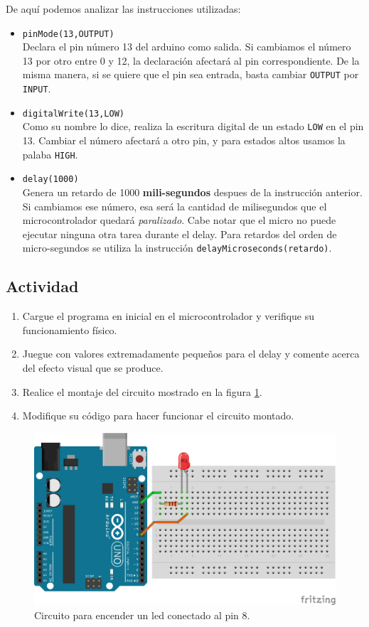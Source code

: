 \documentclass[letterpaper, 10pt]{report}
\begin{document}
De aquí podemos analizar las instrucciones utilizadas:
\begin{itemize}
\item \texttt{pinMode(13,OUTPUT)}\\
Declara el pin número 13 del arduino como salida. Si cambiamos el número 13 por otro entre 0 y 12, la declaración afectará al pin correspondiente. De la misma manera, si se quiere que el pin sea entrada, basta cambiar \texttt{OUTPUT} por \texttt{INPUT}.

\item \texttt{digitalWrite(13,LOW)}\\
Como su nombre lo dice, realiza la escritura digital de un estado \texttt{LOW} en el pin 13. Cambiar el número afectará a otro pin, y para estados altos usamos la palaba \texttt{HIGH}.

\item \texttt{delay(1000)}\\
Genera un retardo de 1000 \textbf{mili-segundos} despues de la instrucción anterior. Si cambiamos ese número, esa será la cantidad de milisegundos que el microcontrolador quedará \emph{paralizado}. Cabe notar que el micro no puede ejecutar ninguna otra tarea durante el delay. Para retardos del orden de micro-segundos se utiliza la instrucción \texttt{delayMicroseconds(retardo)}.
\end{itemize}

\subsection{Actividad}
\begin{enumerate}
\item Cargue el programa en inicial en el microcontrolador y verifique su funcionamiento físico.
\item Juegue con valores extremadamente pequeños para el delay y comente acerca del efecto visual que se produce.
\item Realice el montaje del circuito mostrado en la figura \ref{circ}.
\item Modifique su código para hacer funcionar el circuito montado.
\end{enumerate}

\begin{figure}
\centering
\includegraphics[scale=0.7]{circ1.png}
\caption{Circuito para encender un led conectado al pin 8.\label{circ}}
\end{figure}
\end{document}

